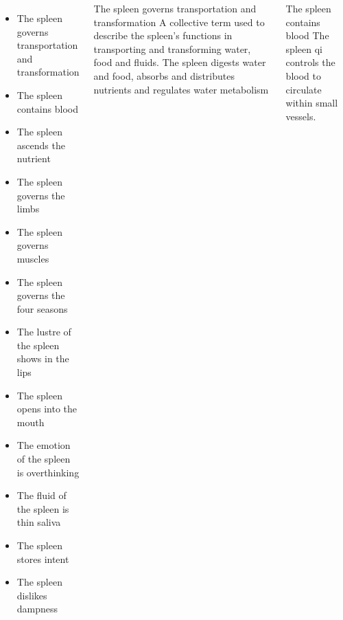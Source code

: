 \documentclass[
	11pt, %
]{beamer}
\theoremstyle{newblock}
\begin{document}
\begin{frame}
	\begin{columns}
		\begin{itemize}
			\item The spleen governs transportation and transformation
			\item The spleen contains blood
			\item The spleen ascends the nutrient
			\item The spleen governs the limbs
			\item The spleen governs muscles 
			\item The spleen governs the four seasons
			\item The lustre of the spleen shows in the lips
			\item The spleen opens into the mouth
			\item The emotion of the spleen is overthinking
			\item The fluid of the spleen is thin saliva
			\item The spleen stores intent
			\item The spleen dislikes dampness
		\end{itemize}
		\begin{block}{The spleen governs transportation and transformation}
			A collective term used to describe the spleen's functions in transporting and transforming water, food and fluids. The spleen digests water and food, absorbs and distributes nutrients and regulates water metabolism
		\end{block}
		\begin{block}{The spleen contains blood}
			The spleen qi controls the blood to circulate within small vessels.
		\end{block}
	\end{columns}
\end{frame}
\end{document}
